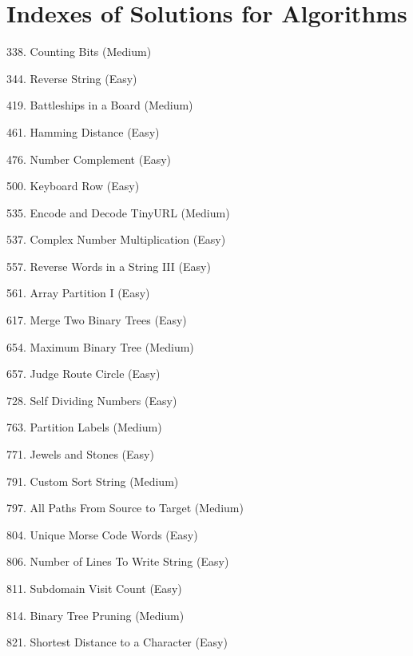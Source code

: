 \tocless\section{Indexes of Solutions for Algorithms}
\label{sec:algo_ind}

\begin{flushleft}
338. Counting Bits (Medium)\hfill\pageref{algo:338}

344. Reverse String (Easy)\hfill\pageref{algo:344}

419. Battleships in a Board (Medium)\hfill\pageref{algo:419}

461. Hamming Distance (Easy)\hfill\pageref{algo:461}

476. Number Complement (Easy)\hfill\pageref{algo:476}

500. Keyboard Row (Easy)\hfill\pageref{algo:500}

535. Encode and Decode TinyURL (Medium)\hfill\pageref{algo:535}

537. Complex Number Multiplication (Easy)\hfill\pageref{algo:537}

557. Reverse Words in a String III (Easy)\hfill\pageref{algo:557}

561. Array Partition I (Easy)\hfill\pageref{algo:561}

617. Merge Two Binary Trees (Easy)\hfill\pageref{algo:617}

654. Maximum Binary Tree (Medium)\hfill\pageref{algo:654}

657. Judge Route Circle (Easy)\hfill\pageref{algo:657}

728. Self Dividing Numbers (Easy)\hfill\pageref{algo:728}

763. Partition Labels (Medium)\hfill\pageref{algo:763}

771. Jewels and Stones (Easy)\hfill\pageref{algo:771}

791. Custom Sort String (Medium)\hfill\pageref{algo:791}

797. All Paths From Source to Target (Medium)\hfill\pageref{algo:797}

804. Unique Morse Code Words (Easy)\hfill\pageref{algo:804}

806. Number of Lines To Write String (Easy)\hfill\pageref{algo:806}

811. Subdomain Visit Count (Easy)\hfill\pageref{algo:811}

814. Binary Tree Pruning (Medium)\hfill\pageref{algo:814}

821. Shortest Distance to a Character (Easy)\hfill\pageref{algo:821}
\end{flushleft}

\newpage
